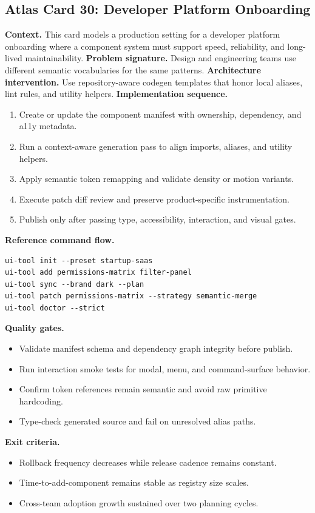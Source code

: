 \subsection*{Atlas Card 30: Developer Platform Onboarding}
\textbf{Context.} This card models a production setting for a developer platform onboarding where a component system must support speed, reliability, and long-lived maintainability.
\textbf{Problem signature.} Design and engineering teams use different semantic vocabularies for the same patterns.
\textbf{Architecture intervention.} Use repository-aware codegen templates that honor local aliases, lint rules, and utility helpers.
\textbf{Implementation sequence.}
\begin{enumerate}[leftmargin=*, itemsep=0.28em]
  \item Create or update the component manifest with ownership, dependency, and a11y metadata.
  \item Run a context-aware generation pass to align imports, aliases, and utility helpers.
  \item Apply semantic token remapping and validate density or motion variants.
  \item Execute patch diff review and preserve product-specific instrumentation.
  \item Publish only after passing type, accessibility, interaction, and visual gates.
\end{enumerate}
\textbf{Reference command flow.}
\begin{verbatim}
ui-tool init --preset startup-saas
ui-tool add permissions-matrix filter-panel
ui-tool sync --brand dark --plan
ui-tool patch permissions-matrix --strategy semantic-merge
ui-tool doctor --strict
\end{verbatim}
\textbf{Quality gates.}
\begin{itemize}[leftmargin=*, itemsep=0.24em]
  \item Validate manifest schema and dependency graph integrity before publish.
  \item Run interaction smoke tests for modal, menu, and command-surface behavior.
  \item Confirm token references remain semantic and avoid raw primitive hardcoding.
  \item Type-check generated source and fail on unresolved alias paths.
\end{itemize}
\textbf{Exit criteria.}
\begin{itemize}[leftmargin=*, itemsep=0.24em]
  \item Rollback frequency decreases while release cadence remains constant.
  \item Time-to-add-component remains stable as registry size scales.
  \item Cross-team adoption growth sustained over two planning cycles.
\end{itemize}
\clearpage
